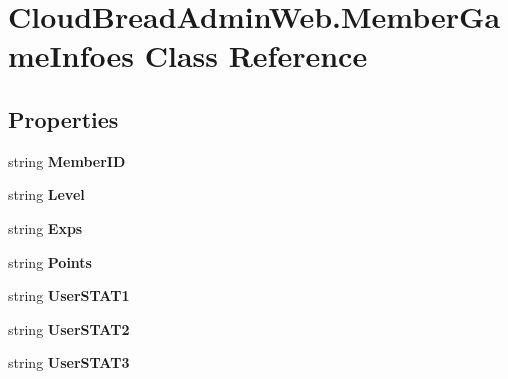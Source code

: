\hypertarget{a00137}{}\section{Cloud\+Bread\+Admin\+Web.\+Member\+Game\+Infoes Class Reference}
\label{a00137}
\subsection*{Properties}
\begin{DoxyCompactItemize}
\item 
string {\bfseries Member\+ID}\hypertarget{a00137_abeb8bfa85659a46e2fe0d123324ae814}{}\label{a00137_abeb8bfa85659a46e2fe0d123324ae814}

\item 
string {\bfseries Level}\hypertarget{a00137_ab53f62460f6ce5f0cd7f470eff24191d}{}\label{a00137_ab53f62460f6ce5f0cd7f470eff24191d}

\item 
string {\bfseries Exps}\hypertarget{a00137_ab9df039b8b7a4e6385ecb3e4f180fcec}{}\label{a00137_ab9df039b8b7a4e6385ecb3e4f180fcec}

\item 
string {\bfseries Points}\hypertarget{a00137_a450ad54c6c1840404237cb077feaee9a}{}\label{a00137_a450ad54c6c1840404237cb077feaee9a}

\item 
string {\bfseries User\+S\+T\+A\+T1}\hypertarget{a00137_a5996b413e2b702a5096966cd8a358aa0}{}\label{a00137_a5996b413e2b702a5096966cd8a358aa0}

\item 
string {\bfseries User\+S\+T\+A\+T2}\hypertarget{a00137_a7c29f8823a7021076683abc38d9a20e2}{}\label{a00137_a7c29f8823a7021076683abc38d9a20e2}

\item 
string {\bfseries User\+S\+T\+A\+T3}\hypertarget{a00137_a5053c389e645b7df82aad629952325cd}{}\label{a00137_a5053c389e645b7df82aad629952325cd}


\end{DoxyCompactItemize}
